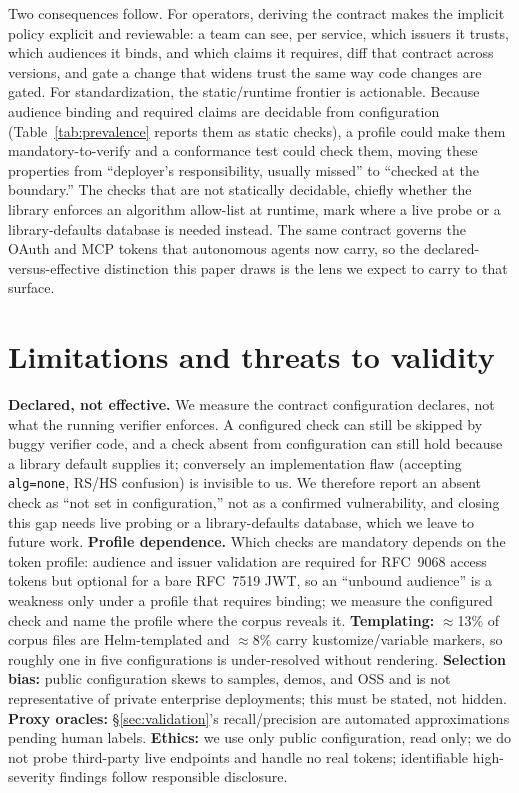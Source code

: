 Two consequences follow. For operators, deriving the contract makes the implicit
policy explicit and reviewable: a team can see, per service, which issuers it trusts,
which audiences it binds, and which claims it requires, diff that contract across
versions, and gate a change that widens trust the same way code changes are gated.
For standardization, the static/runtime frontier is actionable. Because audience
binding and required claims are decidable from configuration (Table~\ref{tab:prevalence}
reports them as static checks), a profile could make them mandatory-to-verify and a
conformance test could check them, moving these properties from ``deployer's
responsibility, usually missed'' to ``checked at the boundary.'' The checks that are
not statically decidable, chiefly whether the library enforces an algorithm
allow-list at runtime, mark where a live probe or a library-defaults database is
needed instead. The same contract governs the OAuth and MCP tokens that autonomous
agents now carry, so the declared-versus-effective distinction this paper draws is
the lens we expect to carry to that surface.

\section{Limitations and threats to validity}\label{sec:limitations}
\textbf{Declared, not effective.} We measure the contract configuration declares,
not what the running verifier enforces. A configured check can still be skipped by
buggy verifier code, and a check absent from configuration can still hold because a
library default supplies it; conversely an implementation flaw (accepting
\texttt{alg=none}, RS/HS confusion) is invisible to us. We therefore report an
absent check as ``not set in configuration,'' not as a confirmed vulnerability, and
closing this gap needs live probing or a library-defaults database, which we leave
to future work. \textbf{Profile dependence.} Which checks are mandatory depends on
the token profile: audience and issuer validation are required for RFC~9068 access
tokens but optional for a bare RFC~7519 JWT, so an ``unbound audience'' is a
weakness only under a profile that requires binding; we measure the configured check
and name the profile where the corpus reveals it. \textbf{Templating:} $\approx$13\% of corpus files are
Helm-templated and $\approx$8\% carry kustomize/variable markers, so roughly one in
five configurations is under-resolved without rendering. \textbf{Selection bias:}
public configuration skews to samples, demos, and OSS and is not representative of
private enterprise deployments; this must be stated, not hidden. \textbf{Proxy
oracles:} \S\ref{sec:validation}'s recall/precision are automated approximations
pending human labels. \textbf{Ethics:} we use only public configuration, read
only; we do not probe third-party live endpoints and handle no real tokens;
identifiable high-severity findings follow responsible disclosure.

